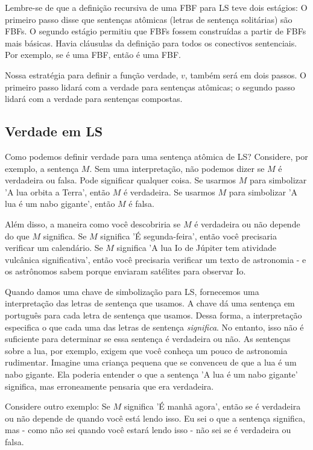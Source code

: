 Lembre-se de que a definição recursiva de uma FBF para LS teve dois estágios: O primeiro passo disse que sentenças atômicas (letras de sentença solitárias) são FBFs. O segundo estágio permitiu que FBFs fossem construídas a partir de FBFs mais básicas. Havia cláusulas da definição para todos os conectivos sentenciais. Por exemplo, se  é uma FBF, então \enot{} é uma FBF.

Nossa estratégia para definir a função verdade, $v$, também será em dois passos. O primeiro passo lidará com a verdade para sentenças atômicas; o segundo passo lidará com a verdade para sentenças compostas.

\subsection{Verdade em LS}
Como podemos definir verdade para uma sentença atômica de LS? Considere, por exemplo, a sentença $M$. Sem uma interpretação, não podemos dizer se $M$ é verdadeira ou falsa. Pode significar qualquer coisa. Se usarmos $M$ para simbolizar 'A lua orbita a Terra', então $M$ é verdadeira. Se usarmos $M$ para simbolizar 'A lua é um nabo gigante', então $M$ é falsa.

Além disso, a maneira como você descobriria se $M$ é verdadeira ou não depende do que $M$ significa. Se $M$ significa 'É segunda-feira', então você precisaria verificar um calendário. Se $M$ significa 'A lua Io de Júpiter tem atividade vulcânica significativa', então você precisaria verificar um texto de astronomia - e os astrônomos sabem porque enviaram satélites para observar Io.

Quando damos uma chave de simbolização para LS, fornecemos uma {interpretação} das letras de sentença que usamos. A chave dá uma sentença em português para cada letra de sentença que usamos. Dessa forma, a interpretação especifica o que cada uma das letras de sentença \emph{significa}. No entanto, isso não é suficiente para determinar se essa sentença é verdadeira ou não. As sentenças sobre a lua, por exemplo, exigem que você conheça um pouco de astronomia rudimentar. Imagine uma criança pequena que se convenceu de que a lua é um nabo gigante. Ela poderia entender o que a sentença 'A lua é um nabo gigante' significa, mas erroneamente pensaria que era verdadeira.

Considere outro exemplo: Se $M$ significa 'É manhã agora', então se é verdadeira ou não depende de quando você está lendo isso. Eu sei o que a sentença significa, mas - como não sei quando você estará lendo isso - não sei se é verdadeira ou falsa.

